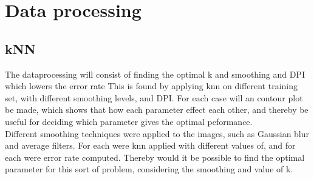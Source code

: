 \chapter{ Data processing}
\section{kNN}
The dataprocessing will consist of finding the optimal k and smoothing and DPI which lowers the error rate  This is found by applying knn on different training set, with different smoothing levels, and DPI.  For each case will an contour plot be made, which shows that how each parameter effect each other, and thereby be useful for deciding which parameter gives the optimal peformance. \\

Different smoothing techniques were applied to the images, such as Gaussian blur and average filters.  
For each were knn applied with different values of, and for each were error rate computed.  Thereby would it be possible to find the optimal parameter for this sort of problem, considering the smoothing and value of k. 


